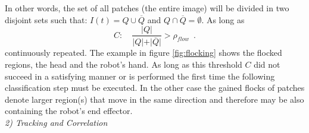 In other words, the set of all patches (the entire image) will be divided in two disjoint sets such that: $I \left( t\right) = Q \cup \overline{Q}$ and $Q \cap \overline{Q} = \emptyset$.  As long as 
\[
C: \quad \dfrac{\vert Q \vert}{\vert Q \vert + \vert \overline{Q} \vert} > \rho_{flow} \enspace .
\]%
continuously repeated. The example in figure \ref{fig:flocking} shows the flocked regions, the head and the robot's hand. 
As long as this threshold $C$ did not succeed in a satisfying manner or is performed the first time the following classification step must be executed. In the other case the gained flocks of patches denote larger region(s) that move in the same direction and therefore may be also containing the robot's end effector.%
%
\\ \newline
%
%
\textit{2) Tracking and Correlation} \newline%

